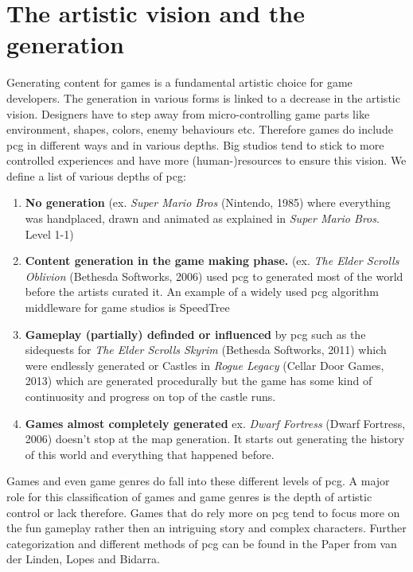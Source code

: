 \documentclass[10pt,a4paper]{article}
\begin{document}
\section{The artistic vision and the generation}\label{sec:visionVSgeneration}
Generating content for games is a fundamental artistic choice for game developers. The generation in various forms is linked to a decrease in the artistic vision. Designers have to step away from micro-controlling game parts like environment, shapes, colors, enemy behaviours etc. Therefore games do include \gls{pcg} in different ways and in various depths. Big studios tend to stick to more controlled experiences and have more (human-)resources to ensure this vision. We define a list of various depths of \gls{pcg}:
\begin{enumerate}
\item \textbf{No generation} (ex. \textit{Super Mario Bros} (Nintendo, 1985) where everything was handplaced, drawn and animated as explained in \textit{Super Mario Bros}. Level 1-1\cite{EurogamerMiyamotoInterview})
\item \textbf{Content generation in the game making phase.} (ex. \textit{The Elder Scrolls Oblivion} (Bethesda Softworks, 2006) used \gls{pcg} to generated most of the world before the artists curated it.\cite{PCGamerCarterInterview} An example of a widely used \gls{pcg} algorithm middleware for game studios is SpeedTree\cite{SpeedTree}
\item \textbf{Gameplay (partially) definded or influenced} by \gls{pcg} such as the sidequests for \textit{The Elder Scrolls Skyrim} (Bethesda Softworks, 2011) which were endlessly generated\cite{Bertz2011} or Castles in \textit{Rogue Legacy} (Cellar Door Games, 2013) which are generated procedurally but the game has some kind of continuosity and progress on top of the castle runs.\cite{Stanton2013}
\item \textbf{Games almost completely generated} ex. \textit{Dwarf Fortress} (Dwarf Fortress, 2006) doesn't stop at the map generation. It starts out generating the history of this world and everything that happened before.\cite{Champandard2012}
\end{enumerate}
Games and even game genres do fall into these different levels of \gls{pcg}. A major role for this classification of games and game genres is the depth of artistic control or lack therefore.\cite{VanderLinden2014} Games that do rely more on \gls{pcg} tend to focus more on the fun gameplay rather then an intriguing story and complex characters. Further categorization and different methods of \gls{pcg} can be found in the Paper from van der Linden, Lopes and Bidarra\cite{VanderLinden2014}.
\end{document}
